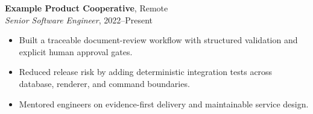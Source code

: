 \textbf{Example Product Cooperative}, Remote\\
\textit{Senior Software Engineer}, 2022--Present
\begin{itemize}
  \item[--] Built a traceable document-review workflow with structured validation and explicit human approval gates.
  \item[--] Reduced release risk by adding deterministic integration tests across database, renderer, and command boundaries.
  \item[--] Mentored engineers on evidence-first delivery and maintainable service design.
\end{itemize}
